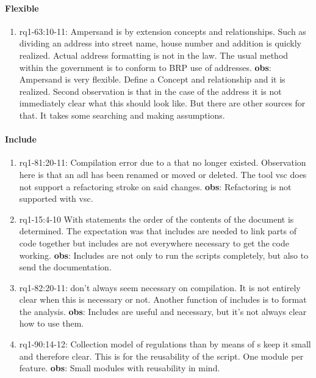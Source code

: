 \paragraph{Flexible}
\begin{enumerate}
    \item rq1-63:10-11: Ampersand is  by extension concepts and relationships.
    Such as dividing an address into street name, house number and addition is quickly realized.
    Actual address formatting is not in the law.
    The usual method within the government is to conform to BRP use of addresses.
    \newline\textbf{obs}: Ampersand is very flexible.
    Define a Concept and relationship and it is realized.
    Second observation is that in the case of the address it is not immediately clear what this should look like.
    But there are other sources for that.
    It takes some searching and making assumptions.

\end{enumerate}

\paragraph{Include}
\begin{enumerate}
    \item rq1-81:20-11: Compilation error due to a  that no longer existed.
    Observation here is that an adl has been renamed or moved or deleted.
    The tool \acrlong{vsc} does not support a refactoring stroke on said changes.
    \newline\textbf{obs}: Refactoring is not supported with \acrlong{vsc}.

    \item rq1-15:4-10 With  statements the order of the contents of the document is determined.
    The expectation was that includes are needed to link parts of code together but includes are not everywhere necessary to get the code working.
    \newline\textbf{obs}: Includes are not only to run the scripts completely, but also to send the documentation.

    \item rq1-82:20-11:  don't always seem necessary on compilation.
    It is not entirely clear when this is necessary or not.
    Another function of includes is to format the analysis.
    \newline\textbf{obs}: Includes are useful and necessary, but it's not always clear how to use them.

    \item rq1-90:14-12: Collection model of regulations than by means of s keep it small and therefore clear.
    This is for the reusability of the script.
    One module per feature.
    \newline\textbf{obs}: Small modules with reusability in mind.

\end{enumerate}
 

